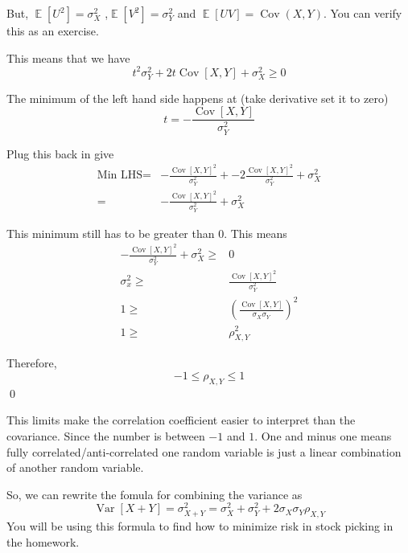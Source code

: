 \documentclass[a4paper, 12pt]{article}
\newcommand{\qedd}{\qed\newline}
\DeclareMathOperator{\E}{\mathbb{E}}
\DeclareMathOperator{\Cov}{Cov}
\DeclareMathOperator{\Var}{Var}
\begin{document}
\begin{multicols}{2}
But, $\E[U^2]=\sigma_X^2$ ,$\E[V^2] =\sigma_Y^2$ and $\E[UV] = \Cov(X,Y)$. You can verify this as an exercise.

This means that we have
\[
	t^2 \sigma_Y^2 + 2 t \Cov[X,Y] + \sigma_X^2 \ge 0
\]

The minimum of the left hand side happens at (take derivative set it to zero)
\[
	t = -\frac{\Cov[X,Y]}{\sigma_Y^2}
\]

Plug this back in give
\begin{align*}
	\text{Min LHS} =& -\frac{\Cov[X,Y]^2}{\sigma_Y^2} + -2\frac{\Cov[X,Y]^2}{\sigma_Y^2} + \sigma_X^2\\
	=& -\frac{\Cov[X,Y]^2}{\sigma_Y^2} + \sigma_X^2
\end{align*}

This minimum still has to be greater than 0. This means
\begin{align*}
	-\frac{\Cov[X,Y]^2}{\sigma_Y^2} + \sigma_X^2 \ge& 0\\
	\sigma_x^2 \ge& \frac{\Cov[X,Y]^2}{\sigma_Y^2}\\
	1 \ge& \left( \frac{\Cov[X,Y]}{\sigma_X \sigma_Y} \right)^2\\
	1 \ge& \rho_{X,Y}^2
\end{align*}

Therefore,
\[
-1 \le \rho_{X,Y} \le 1
\]
\qedd

This limits make the correlation coefficient easier to interpret than the covariance. Since the number is between $-1$ and $1$. One and minus one means fully correlated/anti-correlated one random variable is just a linear combination of another random variable.

So, we can rewrite the fomula for combining the variance as
\[
	\Var[X+Y] = \sigma_{X+Y}^2  = \sigma_X^2 + \sigma_Y^2 + 2 \sigma_X \sigma_Y \rho_{X,Y}
\]
You will be using this formula to find how to minimize risk in stock picking in the homework.
\end{multicols}
\end{document}
